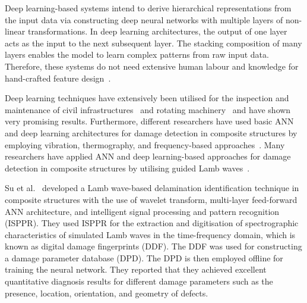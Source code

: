 \begin{sloppypar}
	Deep learning-based systems intend to derive hierarchical representations from the input data via constructing deep neural networks with multiple layers of non-linear transformations.
	In deep learning architectures, the output of one layer acts as the input to the next subsequent layer.
	The stacking composition of many layers enables the model to learn complex patterns from raw input data.
	Therefore, these systems do not need extensive human labour and knowledge for hand-crafted feature design~\cite{Zhao2019b}. %
	
	Deep learning techniques have extensively been utilised for the inspection and maintenance of civil infrastructures~\cite{cha2017deep, Lin2017a, Liu2019} and rotating machinery~\cite{janssens2016convolutional, Jia2016a} and have shown very promising results.
	Furthermore, different researchers have used basic ANN and deep learning architectures for damage detection in composite structures by employing vibration, thermography, and frequency-based approaches~\cite{chakraborty2005artificial, Khan2019a, luo2019temporal, bang2020defect}. 
	Many researchers have applied ANN and deep learning-based approaches for damage detection in composite structures by utilising guided Lamb waves~\cite{Su2004a, chetwynd2008damage, de2015application, feng2019locating, mardanshahi2020detection, qian2020application, Tabian2019, rautela2021ultrasonic}.
	
	Su et al.~\cite{Su2004a} developed a Lamb wave-based delamination identification technique in composite structures with the use of wavelet transform, multi-layer feed-forward ANN architecture, and intelligent signal processing and pattern recognition (ISPPR).
	They used ISPPR for the extraction and digitisation of spectrographic characteristics of simulated Lamb waves in the time-frequency domain, which is known as digital damage fingerprints (DDF).
	The DDF was used for constructing a damage parameter database (DPD). 
	The DPD is then employed offline for training the neural network.
	They reported that they achieved excellent quantitative diagnosis results for different damage parameters such as the presence, location, orientation, and geometry of defects.
	

\end{sloppypar}
